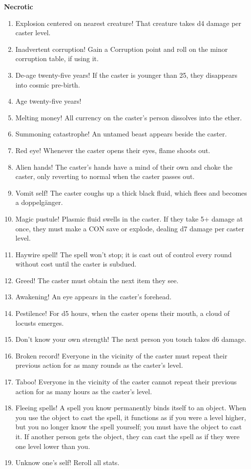 \documentclass[twoside]{article}
\begin{document}
\bigbreak

\textbf{Necrotic}

\begin{enumerate}[nosep]
\item Explosion centered on nearest creature! That creature takes d4 damage per caster level.
\item Inadvertent corruption! Gain a Corruption point and roll on the minor corruption table, if using it.
\item De-age twenty-five years! If the caster is younger than 25, they disappears into cosmic pre-birth.
\item Age twenty-five years!
\item Melting money! All currency on the caster's person dissolves into the ether.
\item Summoning catastrophe! An untamed beast appears beside the caster.
\item Red eye! Whenever the caster opens their eyes, flame shoots out.
\item Alien hands! The caster's hands have a mind of their own and choke the caster, only reverting to normal when the caster passes out.
\item Vomit self! The caster coughs up a thick black fluid, which flees and becomes a doppelg\"anger.
\item Magic pustule! Plasmic fluid swells in the caster. If they take 5+ damage at once, they must make a CON save or explode, dealing d7 damage per caster level.
\item Haywire spell! The spell won't stop; it is cast out of control every round without cost until the caster is subdued.
\item Greed! The caster must obtain the next item they see.
\item Awakening! An eye appears in the caster's forehead.
\item Pestilence! For d5 hours, when the caster opens their mouth, a cloud of locusts emerges.
\item Don't know your own strength! The next person you touch takes d6 damage.
\item Broken record! Everyone in the vicinity of the caster must repeat their previous action for as many rounds as the caster's level.
\item Taboo! Everyone in the vicinity of the caster cannot repeat their previous action for as many hours as the caster's level.
\item Fleeing spells! A spell you know permanently binds itself to an object. When you use the object to cast the spell, it functions as if you were a level higher, but you no longer know the spell yourself; you must have the object to cast it. If another person gets the object, they can cast the spell as if they were one level lower than you.
\item Unknow one's self! Reroll all stats.
\end{enumerate}
\end{document}
